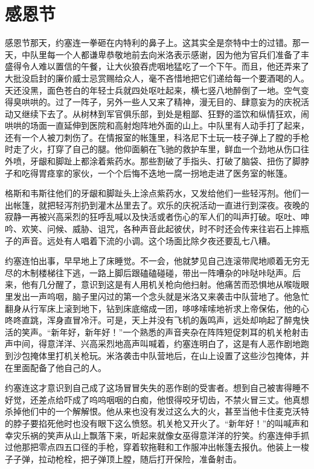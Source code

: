 \chapter{感恩节}
 
    感恩节那天，约塞连一拳砸在内特利的鼻子上。这其实全是奈特中士的过错。那一天，中队里每一个人都谦卑恭敬地前去向米洛表示感谢，因为他为官兵们准备了丰盛得令人难以置信的午餐，让大伙狼吞虎咽地猛吃了一个下午。而且，他还弄来了大批没启封的廉价威士忌赏赐给众人，毫不吝惜地把它们递给每一个要酒喝的人。天还没黑，面色苍白的年轻士兵就四处呕吐起来，横七竖八地醉倒了一地。空气变得臭哄哄的。过了一阵子，另外一些人又来了精神，漫无目的、肆意妄为的庆祝活动又继续下去了。从树林到军官俱乐部，到处是粗鄙、狂野的滥饮和纵情狂欢，闹哄哄的场面一直延伸到医院和高射炮阵地外面的山上。中队里有人动手打了起来，还有一个人被刀刺伤了。在情报室的帐篷里，科洛尼下士玩一枝子弹上了膛的手枪时走了火，打穿了自己的腿。他仰面躺在飞驰的救护车里，鲜血一个劲地从伤口往外喷，牙龈和脚趾上都涂着紫药水。那些割破了手指头、打破了脑袋、扭伤了脚脖子和吃得胃痉挛的家伙，一个个后悔不迭地一腐一拐地走进了医务室的帐篷。

    格斯和韦斯往他们的牙龈和脚趾头上涂点紫药水，又发给他们一些轻泻剂。他们一出帐篷，就把轻泻剂扔到灌木丛里去了。欢乐的庆祝活动一直进行到深夜。夜晚的寂静一再被兴高采烈的狂呼乱喊以及快活或者伤心的军人们的叫声打破。呕吐、呻吟、欢笑、问候、威胁、诅咒，各种声音此起彼伏，时不时还会传来往岩石上摔瓶子的声音。远处有人唱着下流的小调。这个场面比除夕夜还要乱七八糟。

    约塞连怕出事，早早地上了床睡觉。不一会，他就梦见自己连滚带爬地顺着无穷无尽的木制楼梯往下逃，一路上脚后跟磕磕碰碰，带出一阵嘈杂的咔哒咔哒声。后来，他有几分醒了，意识到这是有人用机关枪向他扫射。他痛苦而恐惧地从喉咙眼里发出一声呜咽，脑子里闪过的第一个念头就是米洛又来袭击中队营地了。他急忙翻身从行军床上滚到地下，钻到床底缩成一团，哆哆嗦嗦地祈求上帝保佑，他的心咚咚直跳，浑身直冒冷汗。可是，天上并没有飞机的轰鸣声，远处却响起了醉鬼快活的笑声。“新年好，新年好！”一个熟悉的声音夹杂在阵阵短促刺耳的机关枪射击声中间，得意洋洋、兴高采烈地高声叫喊着，约塞连明白了，这是有人恶作剧地跑到沙包掩体里打机关枪玩。米洛袭击中队营地后，在山上设置了这些沙包掩体，并在里面配备了他自己的人。

    约塞连这才意识到自己成了这场冒冒失失的恶作剧的受害者。想到自己被害得睡不好觉，还差点给吓成了呜呜咽咽的白痴，他恨得咬牙切齿，不禁火冒三丈。他真想杀掉他们中的一个解解恨。他从来也没有发过这么大的火，甚至当他卡住麦克沃特的脖子要掐死他时也没有眼下这么愤怒。机关枪又开火了。“新年好！”的叫喊声和幸灾乐祸的笑声从山上飘落下来，听起来就像女巫得意洋洋的狞笑。约塞连伸手抓过他那把零点四五口径的手枪，穿着软拖鞋和工作服冲出帐篷去报仇。他装上一梭子子弹，拉动枪栓，把子弹顶上膛，随后打开保险，准备射击。

